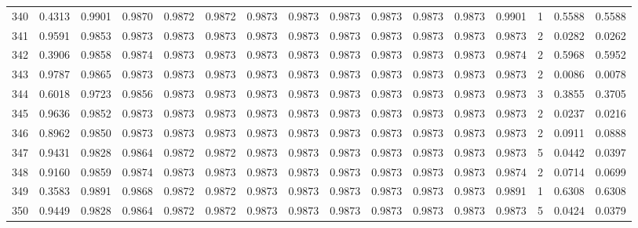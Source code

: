 \begin{tabular}{lrrrrrrrrrrrrrrr}
340 &      0.4313 &  0.9901 &  0.9870 &  0.9872 &  0.9872 &  0.9873 &  0.9873 &  0.9873 &  0.9873 &  0.9873 &   0.9873 &     0.9901 &      1 &                    0.5588 &                     0.5588 \\
341 &      0.9591 &  0.9853 &  0.9873 &  0.9873 &  0.9873 &  0.9873 &  0.9873 &  0.9873 &  0.9873 &  0.9873 &   0.9873 &     0.9873 &      2 &                    0.0282 &                     0.0262 \\
342 &      0.3906 &  0.9858 &  0.9874 &  0.9873 &  0.9873 &  0.9873 &  0.9873 &  0.9873 &  0.9873 &  0.9873 &   0.9873 &     0.9874 &      2 &                    0.5968 &                     0.5952 \\
343 &      0.9787 &  0.9865 &  0.9873 &  0.9873 &  0.9873 &  0.9873 &  0.9873 &  0.9873 &  0.9873 &  0.9873 &   0.9873 &     0.9873 &      2 &                    0.0086 &                     0.0078 \\
344 &      0.6018 &  0.9723 &  0.9856 &  0.9873 &  0.9873 &  0.9873 &  0.9873 &  0.9873 &  0.9873 &  0.9873 &   0.9873 &     0.9873 &      3 &                    0.3855 &                     0.3705 \\
345 &      0.9636 &  0.9852 &  0.9873 &  0.9873 &  0.9873 &  0.9873 &  0.9873 &  0.9873 &  0.9873 &  0.9873 &   0.9873 &     0.9873 &      2 &                    0.0237 &                     0.0216 \\
346 &      0.8962 &  0.9850 &  0.9873 &  0.9873 &  0.9873 &  0.9873 &  0.9873 &  0.9873 &  0.9873 &  0.9873 &   0.9873 &     0.9873 &      2 &                    0.0911 &                     0.0888 \\
347 &      0.9431 &  0.9828 &  0.9864 &  0.9872 &  0.9872 &  0.9873 &  0.9873 &  0.9873 &  0.9873 &  0.9873 &   0.9873 &     0.9873 &      5 &                    0.0442 &                     0.0397 \\
348 &      0.9160 &  0.9859 &  0.9874 &  0.9873 &  0.9873 &  0.9873 &  0.9873 &  0.9873 &  0.9873 &  0.9873 &   0.9873 &     0.9874 &      2 &                    0.0714 &                     0.0699 \\
349 &      0.3583 &  0.9891 &  0.9868 &  0.9872 &  0.9872 &  0.9873 &  0.9873 &  0.9873 &  0.9873 &  0.9873 &   0.9873 &     0.9891 &      1 &                    0.6308 &                     0.6308 \\
350 &      0.9449 &  0.9828 &  0.9864 &  0.9872 &  0.9872 &  0.9873 &  0.9873 &  0.9873 &  0.9873 &  0.9873 &   0.9873 &     0.9873 &      5 &                    0.0424 &                     0.0379 \\

\end{tabular}
